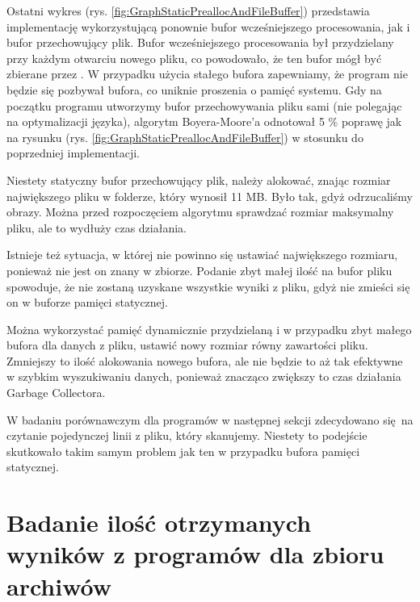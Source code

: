 Ostatni wykres (rys. \ref{fig:GraphStaticPreallocAndFileBuffer}) przedstawia implementację
wykorzystującą ponownie bufor wcześniejszego procesowania, jak i bufor przechowujący plik.
Bufor wcześniejszego procesowania był przydzielany przy każdym otwarciu nowego pliku,
co powodowało, że ten bufor mógł być zbierane przez .
W przypadku użycia stałego bufora zapewniamy, że program nie będzie się pozbywał
bufora, co uniknie proszenia o pamięć systemu. Gdy na początku programu utworzymy
bufor przechowywania pliku sami (nie polegając na optymalizacji języka), algorytm Boyera-Moore'a
odnotował 5 \% poprawę jak na rysunku (rys. \ref{fig:GraphStaticPreallocAndFileBuffer}) w stosunku do poprzedniej implementacji.

Niestety statyczny bufor przechowujący plik, należy alokować, znając rozmiar 
największego pliku w folderze, który wynosił 11 MB. Było tak, gdyż odrzucaliśmy
obrazy. Można przed rozpoczęciem algorytmu sprawdzać rozmiar maksymalny 
pliku, ale to wydłuży czas działania.

Istnieje też sytuacja, w której nie powinno się ustawiać największego rozmiaru, ponieważ nie
jest on znany w zbiorze. Podanie zbyt małej ilość na bufor pliku spowoduje,
że nie zostaną uzyskane wszystkie wyniki z pliku, gdyż nie zmieści się on w buforze pamięci statycznej.

Można wykorzystać pamięć dynamicznie przydzielaną i w przypadku zbyt małego 
bufora dla danych z pliku, ustawić nowy rozmiar równy zawartości pliku.
Zmniejszy to ilość alokowania nowego bufora, ale nie będzie to aż tak efektywne
w szybkim wyszukiwaniu danych, ponieważ znacząco zwiększy to czas działania
Garbage Collectora.

W badaniu porównawczym dla programów w następnej sekcji zdecydowano się na
czytanie pojedynczej linii z pliku, który skanujemy. Niestety to podejście
skutkowało takim samym problem jak ten w przypadku bufora pamięci statycznej.

\section{Badanie ilość otrzymanych wyników z programów dla zbioru archiwów}

